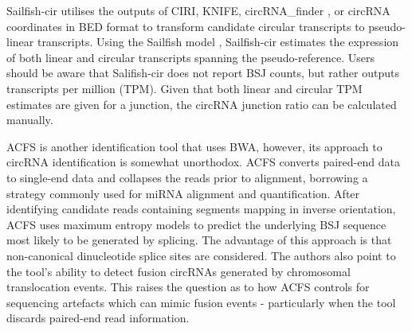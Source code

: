 Sailfish-cir \cite{Sailfishcir} utilises the outputs of CIRI, KNIFE, circRNA\_finder \cite{circRNAfinder}, or circRNA coordinates in BED format to transform candidate circular transcripts to pseudo-linear transcripts. Using the Sailfish model \cite{Patro2014May}, Sailfish-cir estimates the expression of both linear and circular transcripts spanning the pseudo-reference. Users should be aware that Salifish-cir does not report BSJ counts, but rather outputs transcripts per million (TPM). Given that both linear and circular TPM estimates are given for a junction, the circRNA junction ratio can be calculated manually. \par
ACFS \cite{ACFS} is another identification tool that uses BWA, however, its approach to circRNA identification is somewhat unorthodox. ACFS converts paired-end data to single-end data and collapses the reads prior to alignment, borrowing a strategy commonly used for miRNA alignment and quantification. After identifying candidate reads containing segments mapping in inverse orientation, ACFS uses maximum entropy models to predict the underlying BSJ sequence most likely to be generated by splicing. The advantage of this approach is that non-canonical dinucleotide splice sites are considered. The authors also point to the tool's ability to detect fusion circRNAs generated by chromosomal translocation events. This raises the question as to how ACFS controls for sequencing artefacts which can mimic fusion events - particularly when the tool discards paired-end read information. \par
